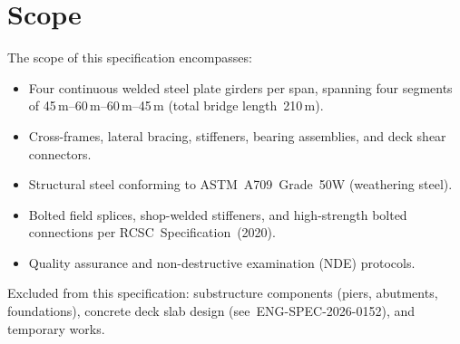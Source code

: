 \section{Scope}

The scope of this specification encompasses:

\begin{itemize}
  \item Four continuous welded steel plate girders per span, spanning four segments of
        45\,m--60\,m--60\,m--45\,m (total bridge length\ 210\,m).
  \item Cross-frames, lateral bracing, stiffeners, bearing assemblies, and deck shear
        connectors.
  \item Structural steel conforming to ASTM\ A709\ Grade\ 50W (weathering steel).
  \item Bolted field splices, shop-welded stiffeners, and high-strength bolted connections
        per RCSC\ Specification\ (2020).
  \item Quality assurance and non-destructive examination (NDE) protocols.
\end{itemize}

Excluded from this specification: substructure components (piers, abutments, foundations),
concrete deck slab design (see\ ENG-SPEC-2026-0152), and temporary works.

